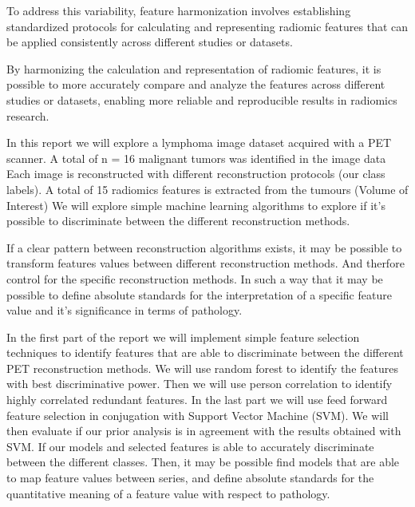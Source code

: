 To address this variability, feature harmonization involves establishing
standardized protocols for calculating and representing radiomic features that
can be applied consistently across different studies or datasets. 

By harmonizing the calculation and representation of radiomic features, it is
possible to more accurately compare and analyze the features across different
studies or datasets, enabling more reliable and reproducible results in
radiomics research.


In this report we will explore a lymphoma image dataset acquired with a PET %
scanner. A total of n = 16 malignant tumors was identified in the image data 
Each image is reconstructed with different reconstruction protocols (our class
labels). A total of 15 radiomics features is extracted from the tumours (Volume
of Interest) 
We will explore simple machine learning algorithms to explore if it's possible
to discriminate between the different reconstruction methods. 

If a clear pattern between reconstruction algorithms exists, it may be possible to
transform features values between different reconstruction methods. And
therfore control for the specific reconstruction methods. In such a way that
it may be possible to define absolute standards for the interpretation of a specific
feature value and it's significance in terms of pathology.       


In the first part of the report we will implement simple feature selection
techniques to identify features that are able to discriminate between the
different PET reconstruction methods. We will use random forest to identify the
features with best discriminative power. Then we will use person correlation to
identify highly correlated redundant features. In the last part we will
use feed forward feature selection in conjugation with Support Vector Machine
(SVM). We will then evaluate if our prior analysis is in agreement with the
results obtained with SVM. If our models and selected features is able to
accurately discriminate between the different classes. Then, it may be possible
find models that are able to map feature values between series, and define
absolute standards for the quantitative meaning of a feature value with respect
to pathology. 

